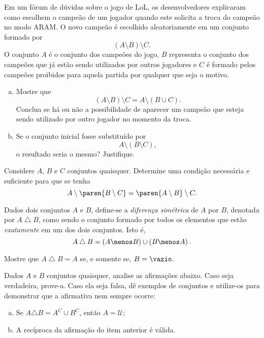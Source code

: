 \begin{exercise}
  Em um fórum de dúvidas sobre o jogo de LoL, os desenvolvedores explicaram como escolhem o campeão de um jogador quando este solicita a troca do campeão no modo ARAM. O novo campeão é escolhido aleatoriamente em um conjunto formado por $$\left(A \setminus B \right) \setminus C.$$
  O conjunto $A$ é o conjunto dos campeões do jogo, $B$ representa o conjunto dos campeões que já estão sendo utilizados por outros jogadores e $C$ é formado pelos campeões proibidos para aquela partida por qualquer que seja o motivo.  \begin{enumerate}[a)]
    \item Mostre que $$\left(A \setminus B \right) \setminus C = A \setminus \left( B \cup C \right).$$ Conclua se há ou não a possibilidade de aparecer um campeão que esteja sendo utilizado por outro jogador no momento da troca. 
    \item Se o conjunto inicial fosse substituído por $$ A \setminus \left( B \setminus C \right),$$ o resultado seria o mesmo? Justifique.
  \end{enumerate}
\end{exercise}

\begin{exercise}
  Considere $A$, $B$ e $C$ conjuntos quaisquer. Determine uma condição necessária e suficiente para que se tenha
  $$A \setminus \paren{B \setminus C} = \paren{A \setminus B} \setminus C.$$
\end{exercise}

\begin{exercise}
  Dados dois conjuntos $A$ e $B$, define-se a \emph{diferença simétrica} de $A$ por $B$, denotada por $A \bigtriangleup B$, como sendo o conjunto formado por todos os elementos que estão \emph{exatamente} em um dos dois conjuntos. Isto é,
$$A \bigtriangleup B = \left( A \menos B \right) \cup \left( B \menos A \right).$$

Mostre que $A \bigtriangleup B = A$ se, e somente se, $B = \vazio$.
\end{exercise}

\begin{exercise}
  Dados $A$ e $B$ conjuntos quaisquer, analise as afirmações abaixo. Caso seja verdadeira, prove-a. Caso ela seja falsa, dê exemplos de conjuntos e utilize-os para demonstrar que a afirmativa nem sempre ocorre:

  \begin{enumerate}[a)]
    \item Se $A \triangle B = A^C \cup B^C$, então $A = \mathcal U$;
    \item A recíproca da afirmação do item anterior é válida.
  \end{enumerate}
\end{exercise}

